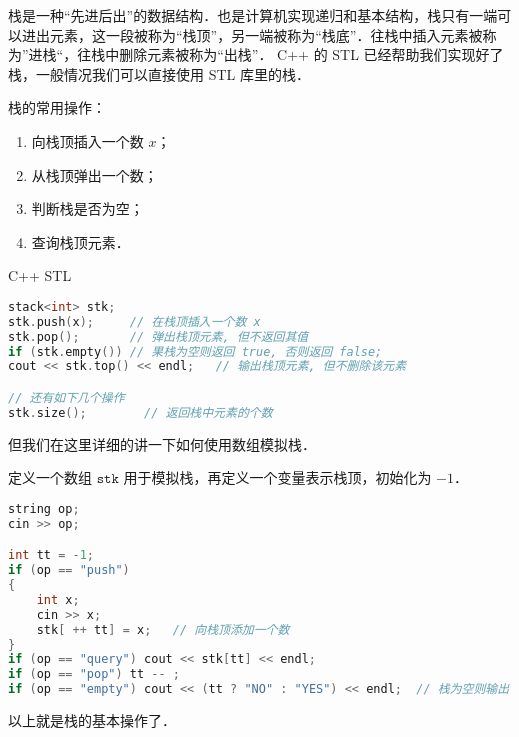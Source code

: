 
栈是一种“先进后出”的数据结构．也是计算机实现递归和基本结构，栈只有一端可以进出元素，这一段被称为“栈顶”，另一端被称为“栈底”．往栈中插入元素被称为”进栈“，往栈中删除元素被称为“出栈”．
C++ 的 STL 已经帮助我们实现好了栈，一般情况我们可以直接使用 STL 库里的栈．

栈的常用操作：
\begin{enumerate}
\item 向栈顶插入一个数 $x$；
\item 从栈顶弹出一个数；
\item 判断栈是否为空；
\item 查询栈顶元素．
\end{enumerate}

C++ STL
\begin{lstlisting}[language=cpp]
stack<int> stk;
stk.push(x);     // 在栈顶插入一个数 x
stk.pop();       // 弹出栈顶元素, 但不返回其值
if (stk.empty()) // 果栈为空则返回 true, 否则返回 false;
cout << stk.top() << endl;   // 输出栈顶元素, 但不删除该元素

// 还有如下几个操作
stk.size();        // 返回栈中元素的个数

\end{lstlisting}

但我们在这里详细的讲一下如何使用数组模拟栈．

定义一个数组 $\mathtt{stk}$ 用于模拟栈，再定义一个变量表示栈顶，初始化为 $-1$．

\begin{lstlisting}[language=cpp]
string op;
cin >> op;

int tt = -1;
if (op == "push")
{
    int x;
    cin >> x;
    stk[ ++ tt] = x;   // 向栈顶添加一个数
} 
if (op == "query") cout << stk[tt] << endl;
if (op == "pop") tt -- ;
if (op == "empty") cout << (tt ? "NO" : "YES") << endl;  // 栈为空则输出 NO，否则为 YES
\end{lstlisting}

以上就是栈的基本操作了．
